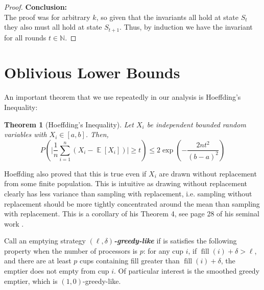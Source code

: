 \documentclass[twocolumn]{article}[11pt]
\newcommand{\defn}[1]{{\textit{\textbf{\boldmath #1}}}}
\DeclareMathOperator{\E}{\mathbb{E}}
\DeclareMathOperator{\fil}{\text{fill}}
\newtheorem{theorem}{Theorem}
\begin{document}
\begin{proof}






\textbf{Conclusion:}\\
The proof was for arbitrary $k$, so given that the invariants all hold at state
$S_t$ they also must all hold at state $S_{t+1}$.
Thus, by induction we have the invariant for all rounds $t\in\mathbb{N}$.
\end{proof}
\clearpage


\section{Oblivious Lower Bounds}\label{sec:oblivious}

An important theorem that we use repeatedly in our analysis is Hoeffding's Inequality:
\begin{theorem}[Hoeffding's Inequality]
  Let $X_i$ be independent bounded random variables with $X_i \in [a,b]$. Then,
  $$P\left(\Big|\frac{1}{n} \sum_{i=1}^n (X_i - \E[X_i])\Big|\ge t\right) \le
  2\exp\left(-\frac{2nt^2}{(b-a)^2}\right) $$
\end{theorem}
Hoeffding also proved that this is true even if $X_i$ are drawn without
replacement from some finite population. This is intuitive as drawing without
replacement clearly has less variance than sampling with replacement, i.e.
sampling without replacement should be more tightly concentrated around the
mean than sampling with replacement. This is a corollary of his Theorem 4, see
page 28 of his seminal work \cite{who62}.

Call an emptying strategy $(\ell, \delta)$\defn{-greedy-like} if is satisfies
the following property when the number of processors is $p$: for any cup
$i$, if $\fil(i) + \delta > \ell$, and there are at least $p$ cups containing fill
greater than $\fil(i) + \delta$, the emptier does not empty from cup $i$.
Of particular interest is the smoothed greedy emptier, which is $(1, 0)$-greedy-like.
\end{document}
